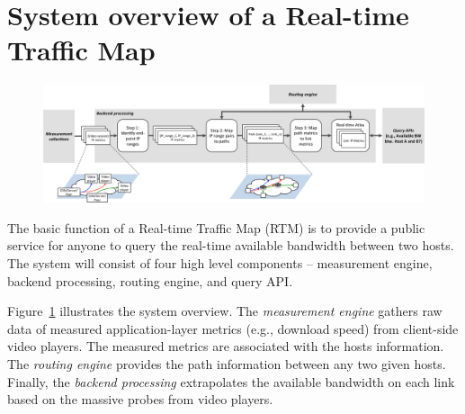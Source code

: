\section{System overview of a Real-time Traffic Map}


\begin{figure}[t!]
\centering
\includegraphics[width=500pt]{figures/system_overview_1.pdf}
\label{fig:overview:system}
\end{figure}


The basic function of a Real-time Traffic Map (RTM) is to provide a public service for anyone to query the real-time available bandwidth between two hosts. The system will consist of four high level components -- measurement engine, backend processing, routing engine, and query API. 


Figure~\ref{fig:overview:system} illustrates the system overview. The {\it measurement engine} gathers raw data of measured application-layer metrics (e.g., download speed) from client-side video players. The measured metrics are associated with the hosts information. The {\it routing engine} provides the path information between any two given hosts. Finally, the {\it backend processing} extrapolates the available bandwidth on each link based on the massive probes from video players.



